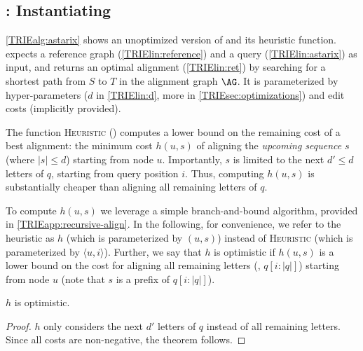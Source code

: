 


\subsection{\astarix: Instantiating \A} \label{TRIEsubsec:astarix-heuristic}
\cref{TRIEalg:astarix} shows an unoptimized version of \astarix and its heuristic
function.
%
\astarix expects a reference graph (\cref{TRIElin:reference}) and a query
(\cref{TRIElin:astarix}) as input, and returns an optimal alignment (\cref{TRIElin:ret})
by searching for a shortest path from $S$ to $T$ in the alignment graph $\AG$.
It is parameterized by hyper-parameters ($d$ in \cref{TRIElin:d}, more in
\cref{TRIEsec:optimizations}) and edit costs (implicitly provided).

The function \textsc{Heuristic}
() computes a lower bound on
the remaining cost of a best alignment: the minimum cost $h(u,s)$ of aligning
the \emph{upcoming sequence} $s$ (where $\lvert s \rvert \leq d$) starting from
node $u$. Importantly, $s$ is limited to the next $d' \leq d$ letters of $q$,
starting from query position $i$. Thus, computing $h(u,s)$ is substantially
cheaper than aligning all remaining letters of $q$.

To compute $h(u,s)$ we leverage a simple branch-and-bound algorithm, provided in
\cref{TRIEapp:recursive-align}. In the following, for convenience, we refer to the
heuristic as $h$ (which is parameterized by $(u,s)$) instead of
\textsc{Heuristic} (which is parameterized by $\langle u, i \rangle$). Further,
we say that $h$ is optimistic if $h(u,s)$ is a lower bound on the cost for
aligning all remaining letters (\ie, $q[i:|q|]$) starting from node $u$ (note
that $s$ is a prefix of $q[i:|q|]$).

\begin{samepage}
\begin{thm} \label{TRIEthm:optimistic}
	$h$ is optimistic.
\end{thm}
\begin{proof}
$h$ only considers the next $d'$ letters of $q$ instead of all
remaining letters. Since all costs are non-negative, the theorem follows.
\end{proof}
\end{samepage}

